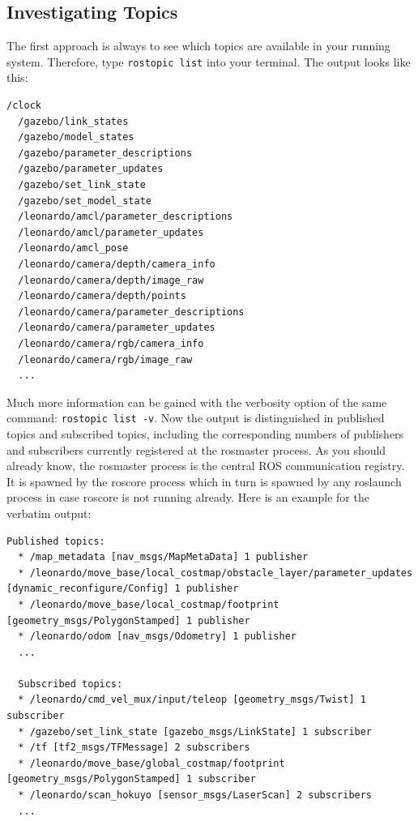\subsection{Investigating Topics}
\label{ssec:Investigating Topics}

The first approach is always to see which topics are available in your running system. Therefore, type \verb$rostopic list$ into your terminal. The output looks like this:

\begin{Verbatim}[fontsize=\scriptsize]
  /clock
  /gazebo/link_states
  /gazebo/model_states
  /gazebo/parameter_descriptions
  /gazebo/parameter_updates
  /gazebo/set_link_state
  /gazebo/set_model_state
  /leonardo/amcl/parameter_descriptions
  /leonardo/amcl/parameter_updates
  /leonardo/amcl_pose
  /leonardo/camera/depth/camera_info
  /leonardo/camera/depth/image_raw
  /leonardo/camera/depth/points
  /leonardo/camera/parameter_descriptions
  /leonardo/camera/parameter_updates
  /leonardo/camera/rgb/camera_info
  /leonardo/camera/rgb/image_raw
  ...
\end{Verbatim}

Much more information can be gained with the verbosity option of the same command: \verb$rostopic list -v$. Now the output is distinguished in published topics and subscribed topics, including the corresponding numbers of publishers and subscribers currently registered at the rosmaster process. As you should already know, the rosmaster process is the central ROS communication registry. It is spawned by the roscore process which in turn is spawned by any roslaunch process in case roscore is not running already. Here is an example for the verbatim output:


\begin{Verbatim}[fontsize=\scriptsize]
  Published topics:
  * /map_metadata [nav_msgs/MapMetaData] 1 publisher
  * /leonardo/move_base/local_costmap/obstacle_layer/parameter_updates [dynamic_reconfigure/Config] 1 publisher
  * /leonardo/move_base/local_costmap/footprint [geometry_msgs/PolygonStamped] 1 publisher
  * /leonardo/odom [nav_msgs/Odometry] 1 publisher
  ...
  
  Subscribed topics:
  * /leonardo/cmd_vel_mux/input/teleop [geometry_msgs/Twist] 1 subscriber
  * /gazebo/set_link_state [gazebo_msgs/LinkState] 1 subscriber
  * /tf [tf2_msgs/TFMessage] 2 subscribers
  * /leonardo/move_base/global_costmap/footprint [geometry_msgs/PolygonStamped] 1 subscriber
  * /leonardo/scan_hokuyo [sensor_msgs/LaserScan] 2 subscribers
  ...
\end{Verbatim}

